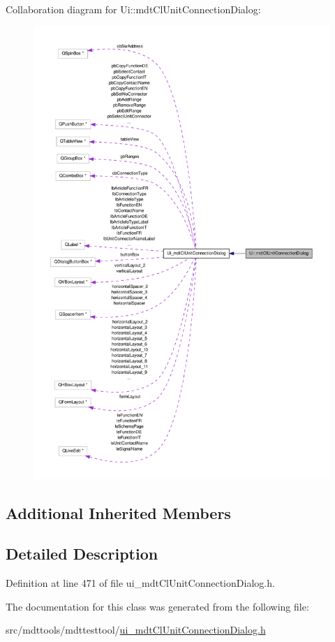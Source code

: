 Collaboration diagram for Ui\-:\-:mdt\-Cl\-Unit\-Connection\-Dialog\-:\nopagebreak
\begin{figure}[H]
\begin{center}
\leavevmode
\includegraphics[width=350pt]{class_ui_1_1mdt_cl_unit_connection_dialog__coll__graph}
\end{center}
\end{figure}
\subsection*{Additional Inherited Members}


\subsection{Detailed Description}


Definition at line 471 of file ui\-\_\-mdt\-Cl\-Unit\-Connection\-Dialog.\-h.



The documentation for this class was generated from the following file\-:\begin{DoxyCompactItemize}
\item 
src/mdttools/mdttesttool/\hyperlink{ui__mdt_cl_unit_connection_dialog_8h}{ui\-\_\-mdt\-Cl\-Unit\-Connection\-Dialog.\-h}\end{DoxyCompactItemize}
